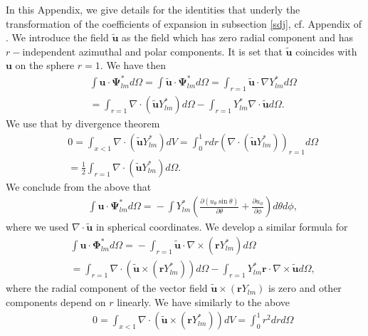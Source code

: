 \documentclass[aps,prx,twocolumn,amsmath,amssymb,amsfonts]{revtex4-2}
\begin{document}
{{\begin{appendices}
In this Appendix, we give details for the identities that underly the transformation of the coefficients of expansion in subsection \ref{sdj}, cf. Appendix of \cite{carra}. We introduce the field $\bm {\tilde u}$ as the field which has zero radial component and has $r-$independent azimuthal
and polar components. It is set that $\bm {\tilde u}$ coincides with $\bm u$ on the sphere $r=1$. We have then
\begin{eqnarray}&&
\int \bm u\cdot \bm \Psi_{lm}^* d\Omega=\int \bm {\tilde u}\cdot \bm \Psi_{lm}^* d\Omega=\int_{r=1}\bm {\tilde u}\cdot\nabla Y_{lm}^* d\Omega
\nonumber\\&&
=\int_{r=1}\nabla\cdot \left(\bm {\tilde u} Y_{lm}^*\right) d\Omega-\int_{r=1}Y_{lm}^* \nabla\cdot \bm {\tilde u} d\Omega.
\end{eqnarray}
We use that by divergence theorem
\begin{eqnarray}&&
0=\int_{x<1}\nabla\cdot \left(\bm {\tilde u} Y_{lm}^*\right) dV=\int_0^1 r dr \left(\nabla\cdot \left(\bm {\tilde u} Y_{lm}^*\right)\right)_{r=1}  d\Omega\nonumber\\&&
=\frac{1}{2}\int_{r=1}\nabla\cdot \left(\bm {\tilde u} Y_{lm}^*\right) d\Omega.
\end{eqnarray}
We conclude from the above that
\begin{eqnarray}&&\!\!\!\!\!\!\!
\int \!\!\bm u\!\cdot\! \bm \Psi_{lm}^* d\Omega\!=\!-\int \! Y_{lm}^* \left(\frac{\partial (u_{\theta}\sin\theta)}{\partial\theta}\!+\!\frac{\partial u_{\phi}}{\partial\phi}\right) d\theta d\phi, \label{projectpsi}
\end{eqnarray}
where we used $\nabla\cdot \bm {\tilde u}$ in spherical coordinates. We develop a similar formula for
\begin{eqnarray}&&\!\!\!\!\!\!\!
\int \!\!\bm u\!\cdot\! \bm \Phi_{lm}^* d\Omega\!=\!-\!\int_{r=1} \bm {\tilde u}\cdot \nabla\!\times\! (\bm r Y^*_{lm}) d\Omega\nonumber\\&&\!\!\!\!\!\!\!
=\int_{r=1} \nabla\cdot \left(\bm {\tilde u}\!\times\! (\bm r Y^*_{lm}) \right)  d\Omega\!-\!
\int_{r=1}  Y^*_{lm} \bm r\cdot\nabla\!\times\! \bm {\tilde u}d\Omega,
\end{eqnarray}
where the radial component of the vector field $\bm {\tilde u}\!\times\! (\bm r Y_{lm})$ is zero and other components depend on $r$ linearly. We have similarly to the above
\begin{eqnarray}&&
0=\int_{x<1} \nabla\cdot \left(\bm {\tilde u}\!\times\! (\bm r Y^*_{lm}) \right)  dV=\int_0^1 r^2 dr   d\Omega\\&&

\end{eqnarray}
\end{appendices}}}
\end{document}
